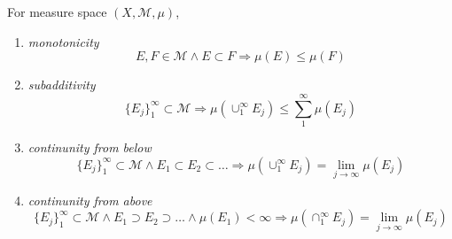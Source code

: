 \begin{thm}\label{thm:1.8}\label{thm:01:measure-char}
  For measure space ${(X, \mathcal{M},\mu)}$,
  \begin{enumerate}[label=(\alph*)]
  \item\label{thm:01:itm:mon}\emph{monotonicity}
    \[
    E,F\in\mathcal{M}\land E\subset F
    \Longrightarrow
    \mu(E)\leq\mu(F)
    \]
  \item\label{thm:01:itm:sub}\emph{subadditivity}
    \[
    \{E_j\}_1^\infty\subset\mathcal{M}
    \Longrightarrow
    \mu(\cup_1^\infty E_j) \leq \sum_1^\infty \mu(E_j)
    \]
  \item\label{thm:01:itm:cts-below}\emph{continunity from below}
    \[
    \{E_j\}_1^\infty\subset\mathcal{M} \land E_1\subset E_2\subset\ldots
    \Longrightarrow
    \mu(\cup_1^\infty E_j) = \lim_{j\rightarrow\infty} \mu(E_j)
    \]
  \item\label{thm:01:itm:cts-above}\emph{continunity from above}
    \[
    \{E_j\}_1^\infty\subset\mathcal{M} \land E_1\supset E_2\supset\ldots
    \land \mu(E_1)<\infty
    \Longrightarrow
    \mu(\cap_1^\infty E_j) = \lim_{j\rightarrow\infty} \mu(E_j)
    \]
  \end{enumerate}
\end{thm}
